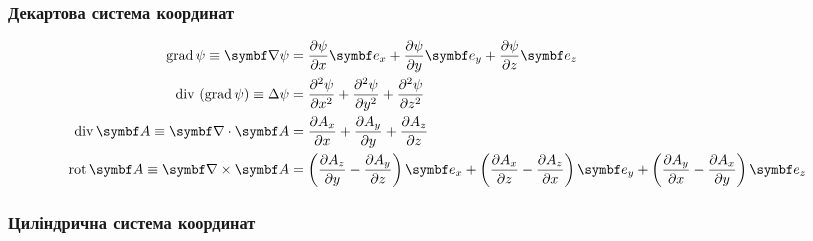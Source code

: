 \subsubsection{Декартова система координат}

\begin{align}\label{cartesian}
	\mathrm{grad}\,\psi \equiv \vect{\nabla}\psi & = \frac{\partial \psi}{\partial x} \vect{e}_x + \frac{\partial \psi}{\partial y} \vect{e}_y +
	\frac{\partial \psi}{\partial z} \vect{e}_z \\
	\mathrm{div}\,\left(\mathrm{grad}\,\psi\right) \equiv \Laplasian\psi    & = \frac{\partial^2 \psi}{\partial x^2} + \frac{\partial^2 \psi}{\partial y^2} + \frac{\partial^2 \psi }{\partial z^2}               \\
	\mathrm{div}\,\vect{A} \equiv \divg\vect{A}     & = \frac{\partial A_x}{\partial x}  + \frac{\partial A_y}{\partial y} + \frac{\partial A_z}{\partial z}                              \\
	\mathrm{rot}\,\vect{A} \equiv  \rot\vect{A}      & = \left( \frac{\partial A_z}{\partial y}  - \frac{\partial A_y}{\partial z}\right)  \vect{e}_x +
	\left( \frac{\partial A_x}{\partial z}  - \frac{\partial A_z}{\partial x}\right)  \vect{e}_y +
	\left( \frac{\partial A_y}{\partial x}  - \frac{\partial A_x}{\partial y}\right)  \vect{e}_z
\end{align}

\subsubsection{Циліндрична система координат}

